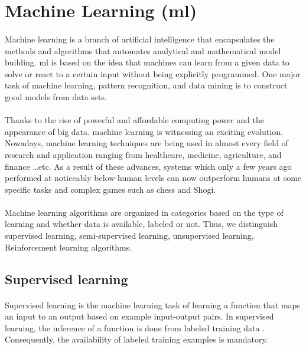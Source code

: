 \section{Machine Learning (\acs{ml})}
\paragraph{}
Machine learning is a branch of artificial intelligence that encapsulates the methods and algorithms that automates analytical and mathematical model building. \acs{ml} is based on the idea that machines can learn from a given data to solve or react to a certain input without being explicitly programmed\cite{ML:1}. One major task of machine learning, pattern recognition, and data mining is to construct good models from data sets.
\paragraph{}
Thanks to the rise of powerful and affordable computing power and the appearance of big data. machine learning is witnessing an exciting evolution. Nowadays, machine learning techniques are being used in almost every field of research and application ranging from healthcare, medicine, agriculture, and finance \dots etc. As a result of these advances, systems which only a few years ago performed at noticeably below-human levels can now outperform humans at some specific tasks and complex games such as chess and Shogi\cite{DeepBlue,alphaZero}.
\paragraph{}
Machine learning algorithms are organized in categories based on the type of learning and whether data is available, labeled or not. Thus, we distinguish supervised learning, semi-supervised learning, unsupervised learning, Reinforcement learning algorithms.
\subsection{Supervised learning}
\paragraph{}
Supervised learning is the machine learning task of learning a function that maps an input to an output based on example input-output pairs\cite{ML:2}. In supervised learning, the inference of a function is done from labeled training data \cite{ML:3}. Consequently, the availability of labeled training examples is mandatory.
